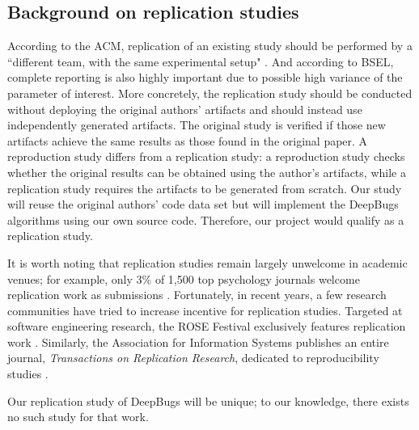 \subsection{Background on replication studies}
\label{subsec:background_on_replication_studies}


According to the ACM, replication of an existing study should be performed by a ``different team, with the same experimental setup" \cite{noauthor_artifact_nodate}. And according to BSEL, complete reporting is also highly important due to possible high variance of the parameter of interest. \cite{shepperd_role_2018} More concretely, the replication study should be conducted without deploying the original authors' artifacts and should instead use independently generated artifacts. The original study is verified if those new artifacts achieve the same results as those found in the original paper. A reproduction study differs from a replication study: a reproduction study checks whether the original results can be obtained using the author's artifacts, while a replication study requires the artifacts to be generated from scratch. Our study will reuse the original authors' code data set \cite{pradel_michaelpradeldeepbugs_2021} but will implement the DeepBugs algorithms using our own source code. Therefore, our project would qualify as a replication study.

It is worth noting that replication studies remain largely unwelcome in academic venues; for example, only 3\% of 1,500 top psychology journals welcome replication work as submissions \cite{martin_are_2017}. Fortunately, in recent years, a few research communities have tried to increase incentive for replication studies. Targeted at software engineering research, the ROSE Festival exclusively features replication work \cite{noauthor_rose_nodate}. Similarly, the Association for Information Systems publishes an entire journal, \textit{Transactions on Replication Research}, dedicated to reproducibility studies \cite{noauthor_ais_nodate}.

Our replication study of DeepBugs will be unique; to our knowledge, there exists no such study for that work.